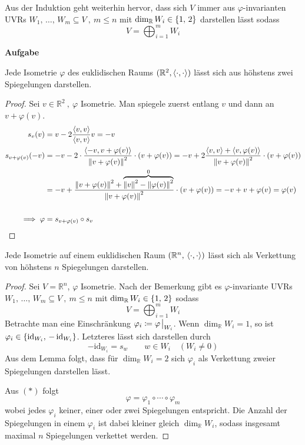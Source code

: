 \documentclass[a4paper, 12pt]{scrartcl}
\newcounter{taski}
\newcommand{\task}{\stepcounter{taski}\textbf{Aufgabe \arabic{taski}}~}
\DeclareMathOperator*{\id}{id}
\begin{document}
\begin{note}
    Aus der Induktion geht weiterhin hervor, dass sich $V$ immer aus $\varphi$-invarianten UVRs $W_1,\,\dots,\,  W_m \subseteq V ~,~m \leq n$ mit $\dim_ \mathbb{R} W_i \in \qty{1,\, 2}$ darstellen lässt sodass
    \[ V = \bigoplus_{i=1}^m W_i \]
\end{note}
\setcounter{taski}{31}
\newpage
\task
\begin{lemma}
    Jede Isometrie $\varphi$ des euklidischen Raums $(\mathbb{R}^2, \expval{\cdot,\cdot})$ lässt sich aus höhstens zwei Spiegelungen darstellen.
\end{lemma}
\begin{proof}
Sei $v \in \mathbb{R}^2 ~,~ \varphi$ Isometrie. Man spiegele zuerst entlang $v$ und dann an $v + \varphi(v)$. 
\begin{align*}
    s_v(v) &= v - 2\frac{\expval{v,v}}{\expval{v,v}}v = -v \\
    s_{v + \varphi(v)}(-v) &= -v - 2 \cdot \frac{\expval{-v, v+\varphi(v)}}{\norm{v+\varphi(v)}^2} \cdot (v+\varphi(v))
    = -v + 2\frac{\expval{v,v} + \expval{v,\varphi(v)}}{\norm{v+\varphi(v)}^2}\cdot (v+\varphi(v)) \\
                           &= -v + \frac{\norm{v+\varphi(v)}^2 + \overbrace{\norm{v}^2 -\norm{\varphi(v)}^2}^0}{\norm{v+\varphi(v)}^2}\cdot (v+\varphi(v)) = -v + v + \varphi(v) = \varphi(v) \\\\
    \implies \varphi&= s_{v+\varphi(v)} \circ s_v 
\end{align*}
\end{proof}

\begin{theorem}
    Jede Isometrie auf einem euklidischen Raum $(\mathbb{R}^n,\, \expval{\cdot,\cdot})$ lässt sich als Verkettung von höhstens $n$ Spiegelungen darstellen.
\end{theorem}
\begin{proof} Sei $V = \mathbb{R}^n$, $\varphi$ Isometrie.
Nach der Bemerkung gibt es $\varphi$-invariante UVRs $W_1,\,\dots,\,  W_m \subseteq V ~,~m \leq n$ mit $\dim_ \mathbb{R} W_i \in \qty{1,\, 2}$ sodass
\[ V = \bigoplus_{i=1}^m W_i \tag{$\ast$} \]
Betrachte man eine Einschränkung $\varphi_i \coloneqq \varphi\eval_{W_i}$. Wenn $\dim_ \mathbb{R} W_i = 1$, so ist $\varphi_i \in \qty{\id_{W_i},\, -\id_{W_i}}$. Letzteres lässt sich darstellen durch
\[ -\textrm{id}_{W_i} = s_w \qquad w \in W_i \quad (W_i \neq \qty{0}) \]
Aus dem Lemma folgt, dass für $\dim_ \mathbb{R} W_i = 2$ sich $\varphi_i$ als Verkettung zweier Spiegelungen darstellen lässt.

Aus $(\ast)$ folgt
\[ \varphi = \varphi_1 \circ \cdots \circ \varphi_m \]
wobei jedes $\varphi_i$ keiner, einer oder zwei Spiegelungen entspricht. Die Anzahl der Spiegelungen in einem $\varphi_i$ ist dabei kleiner gleich $\dim_ \mathbb{R} W_i$, sodass insgesamt maximal $n$ Spiegelungen verkettet werden.
\end{proof}
\end{document}
